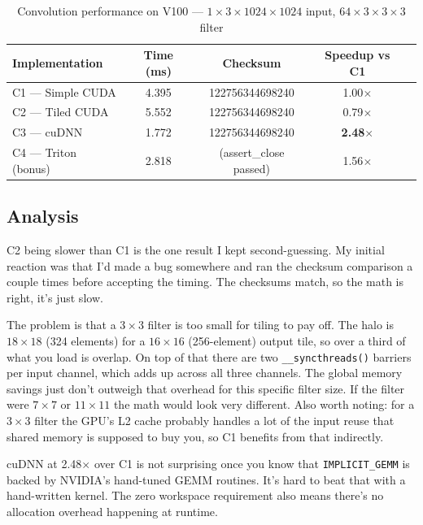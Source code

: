 \documentclass[11pt,letterpaper]{article}
\begin{document}
\begin{table}[H]
\centering
\caption{Convolution performance on V100 --- $1 \times 3 \times 1024 \times 1024$
         input, $64 \times 3 \times 3 \times 3$ filter}
\begin{tabular}{lcccc}
\toprule
\textbf{Implementation} & \textbf{Time (ms)} & \textbf{Checksum} & \textbf{Speedup vs C1} \\
\midrule
C1 --- Simple CUDA      & 4.395  & 122756344698240 & 1.00$\times$ \\
C2 --- Tiled CUDA       & 5.552  & 122756344698240 & 0.79$\times$ \\
C3 --- cuDNN            & 1.772  & 122756344698240 & \textbf{2.48}$\times$ \\
C4 --- Triton (bonus)   & 2.818  & (assert\_close passed) & 1.56$\times$ \\
\bottomrule
\end{tabular}
\end{table}

\subsection{Analysis}

C2 being slower than C1 is the one result I kept second-guessing. My initial
reaction was that I'd made a bug somewhere and ran the checksum comparison a
couple times before accepting the timing. The checksums match, so the math is
right, it's just slow.

The problem is that a $3\times3$ filter is too small for tiling to pay off. The
halo is $18\times18$ (324 elements) for a $16\times16$ (256-element) output tile,
so over a third of what you load is overlap. On top of that there are two
\texttt{\_\_syncthreads()} barriers per input channel, which adds up across all
three channels. The global memory savings just don't outweigh that overhead for
this specific filter size. If the filter were $7\times7$ or $11\times11$ the math
would look very different. Also worth noting: for a $3\times3$ filter the GPU's L2
cache probably handles a lot of the input reuse that shared memory is supposed to
buy you, so C1 benefits from that indirectly.

cuDNN at 2.48$\times$ over C1 is not surprising once you know that
\texttt{IMPLICIT\_GEMM} is backed by NVIDIA's hand-tuned GEMM routines. It's hard
to beat that with a hand-written kernel. The zero workspace requirement also means
there's no allocation overhead happening at runtime.
\end{document}
